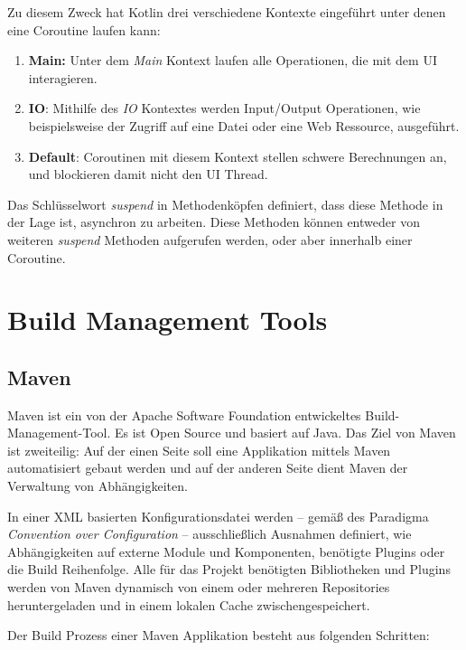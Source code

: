 				Zu diesem Zweck hat Kotlin drei verschiedene Kontexte eingeführt unter denen eine Coroutine laufen kann:
				
				\begin{enumerate}
					\item 
						\textbf{Main:} Unter dem \textit{Main} Kontext laufen alle Operationen, die mit dem \acs{UI} interagieren. 
					\item 
						\textbf{IO}: Mithilfe des \textit{\acs{IO}} Kontextes werden Input/Output Operationen, wie beispielsweise der Zugriff auf eine Datei oder eine Web Ressource, ausgeführt.
					\item 
						\textbf{Default}: Coroutinen mit diesem Kontext stellen schwere Berechnungen an, und blockieren damit nicht den \acs{UI} Thread.
				\end{enumerate}
				
				Das Schlüsselwort \textit{suspend} in Methodenköpfen definiert, dass diese Methode in der Lage ist, asynchron zu arbeiten. Diese Methoden können entweder von weiteren \textit{suspend} Methoden aufgerufen werden, oder aber innerhalb einer Coroutine.
				
	\section{Build Management Tools} %
	
		\subsection{Maven} %
			
			 Maven ist ein von der Apache Software Foundation entwickeltes Build-Management-Tool. Es ist Open Source und basiert auf Java. Das Ziel von Maven ist zweiteilig: Auf der einen Seite soll eine Applikation mittels Maven automatisiert gebaut werden und auf der anderen Seite dient Maven der Verwaltung von Abhängigkeiten. 
			 
			 In einer XML basierten Konfigurationsdatei werden -- gemäß des Paradigma \textit{Convention over Configuration} -- ausschließlich Ausnahmen definiert, wie Abhängigkeiten auf externe Module und Komponenten, benötigte Plugins oder die Build Reihenfolge. Alle für das Projekt benötigten Bibliotheken und Plugins werden von Maven dynamisch von einem oder mehreren Repositories heruntergeladen und in einem lokalen Cache zwischengespeichert. \cite{Company.2009}
			 
			 Der Build Prozess einer Maven Applikation besteht aus folgenden Schritten:
			 
